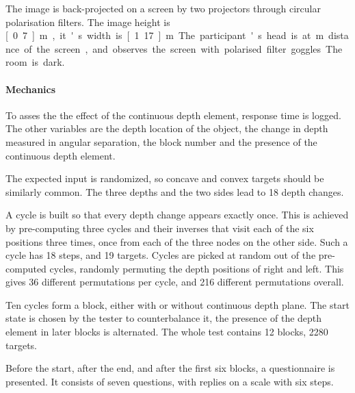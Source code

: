 The image is back-projected on a screen by two projectors through circular polarisation filters. The image height is \unit[0.7]{m}, it's width is \unit[1.17]{m}. The participant's head is at \unit[1]{m} distance of the screen, and observes the screen with polarised filter goggles. The room is dark.

\paragraph{Mechanics}
To asses the the effect of the continuous depth element, response time is logged. The other variables are the depth location of the object, the change in depth measured in angular separation, the block number and the presence of the continuous depth element.

The expected input is randomized, so concave and convex targets should be similarly common. The three depths and the two sides lead to 18 depth changes.

A cycle is built so that every depth change appears exactly once. This is achieved by pre-computing three cycles and their inverses that visit each of the six positions three times, once from each of the three nodes on the other side. Such a cycle has 18 steps, and 19 targets.
Cycles are picked at random out of the pre-computed cycles, randomly permuting the depth positions of right and left.
This gives 36 different permutations per cycle, and 216 different permutations overall.

Ten cycles form a block, either with or without continuous depth plane. The start state is chosen by the tester to counterbalance it, the presence of the depth element in later blocks is alternated.
The whole test contains 12 blocks, 2280 targets.

Before the start, after the end, and after the first six blocks, a questionnaire is presented. It consists of seven questions, with replies on a scale with six steps.
